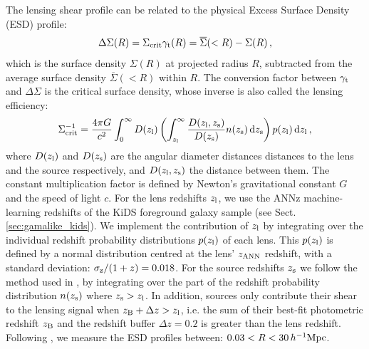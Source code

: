 \documentclass[usenatbib]{mnras}
\newcommand{\hMpc}{\, h^{-1}{\rm{Mpc}} }
\newcommand*{\mean}[1]{\overline{#1}}
\newcommand{\un}[1]{_{\rm #1}}
\begin{document}
The lensing shear profile can be related to the physical Excess Surface Density (ESD) profile:
\begin{equation}
	\Delta \Sigma (R) = \Sigma_{\rm crit} \gamma_{\rm t}(R) = \mean{\Sigma}(<R) - \Sigma(R) \, ,
	\label{eq:deltasigma}
\end{equation}
which is the surface density $\Sigma(R)$ at projected radius $R$, subtracted from the average surface density $\mean{\Sigma}(<R)$ within $R$. The conversion factor between $\gamma\un{t}$ and $\Delta\Sigma$ is the critical surface density, whose inverse is also called the lensing efficiency:
\begin{equation}
	\Sigma\un{crit}^{-1} = \frac{4\pi G}{c^2} \int_{0}^{\infty} D(z\un{l}) \left( \int_{z\un{l}}^{\infty}  \frac{D(z\un{l}, z\un{s})}{D(z\un{s})} n(z\un{s}) \, {\rm d} z\un{s} \right) p(z\un{l}) \, {\rm d} z\un{l} \, ,
	\label{eq:sigmacrit}
\end{equation}
where $D(z\un{l})$ and $D(z\un{s})$ are the angular diameter distances distances to the lens and the source respectively, and $D(z\un{l}, z\un{s})$ the distance between them. The constant multiplication factor is defined by Newton's gravitational constant $G$ and the speed of light $c$. For the lens redshifts $z\un{l}$, we use the ANNz machine-learning redshifts of the KiDS foreground galaxy sample (see Sect. \ref{sec:gamalike_kids}). We implement the contribution of $z\un{l}$ by integrating over the individual redshift probability distributions $p(z\un{l})$ of each lens. This $p(z\un{l})$ is defined by a normal distribution centred at the lens' $z\un{ANN}$ redshift, with a standard deviation: $\sigma\un{z}/(1+z) = 0.018$. For the source redshifts $z\un{s}$ we follow the method used in \cite{dvornik2018}, by integrating over the part of the redshift probability distribution $n(z\un{s})$ where $z\un{s}>z\un{l}$. In addition, sources only contribute their shear to the lensing signal when $z\un{B}+\Delta z > z\un{l}$, i.e. the sum of their best-fit photometric redshift $z\un{B}$ and the redshift buffer $\Delta z=0.2$ is greater than the lens redshift. Following \cite{brouwer2017}, we measure the ESD profiles between: $0.03 < R < 30 \hMpc$.
\end{document}
